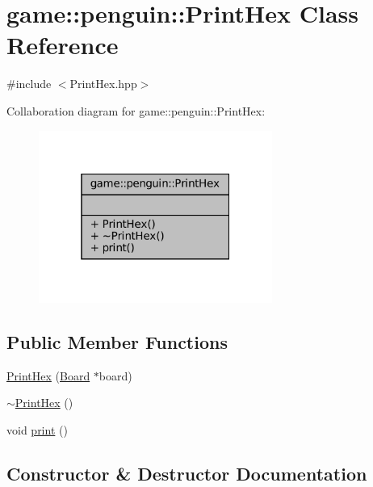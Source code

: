 \hypertarget{classgame_1_1penguin_1_1_print_hex}{}\section{game\+:\+:penguin\+:\+:Print\+Hex Class Reference}
\label{classgame_1_1penguin_1_1_print_hex}


{\ttfamily \#include $<$Print\+Hex.\+hpp$>$}



Collaboration diagram for game\+:\+:penguin\+:\+:Print\+Hex\+:
\nopagebreak
\begin{figure}[H]
\begin{center}
\leavevmode
\includegraphics[width=217pt]{classgame_1_1penguin_1_1_print_hex__coll__graph}
\end{center}
\end{figure}
\subsection*{Public Member Functions}
\begin{DoxyCompactItemize}
\item 
\hyperlink{classgame_1_1penguin_1_1_print_hex_acdb07dd749d832db180a0f42040e33ed}{Print\+Hex} (\hyperlink{classgame_1_1penguin_1_1_board}{Board} $\ast$board)
\item 
\hyperlink{classgame_1_1penguin_1_1_print_hex_a45fcb3f28b57d867ee835b957c323bc6}{$\sim$\+Print\+Hex} ()
\item 
void \hyperlink{classgame_1_1penguin_1_1_print_hex_a87a58be4fea97f043e6dbe01a3045c1d}{print} ()
\end{DoxyCompactItemize}


\subsection{Constructor \& Destructor Documentation}
\mbox{\label{classgame_1_1penguin_1_1_print_hex_acdb07dd749d832db180a0f42040e33ed}} 
